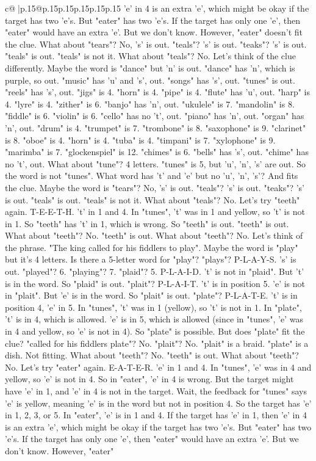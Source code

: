 \documentclass{article}
\begin{document}
{\begin{supertabular}{c@{$\;$}|p{.15\linewidth}@{}p{.15\linewidth}p{.15\linewidth}p{.15\linewidth}p{.15\linewidth}p{.15\linewidth}}
{{{'e' in 4 is an extra 'e', which might be okay if the target has two 'e's. But "eater" has two 'e's. If the target has only one 'e', then "eater" would have an extra 'e'. But we don't know. However, "eater" doesn't fit the clue. What about "tears"? No, 's' is out. "teals"? 's' is out. "teaks"? 's' is out. "teals" is out. "teals" is not it. What about "teals"? No. Let's think of the clue differently. Maybe the word is "dance" but 'n' is out. "dance" has 'n', which is purple, so out. "music" has 'u' and 's', out. "songs" has 's', out. "tunes" is out. "reels" has 's', out. "jigs" is 4. "horn" is 4. "pipe" is 4. "flute" has 'u', out. "harp" is 4. "lyre" is 4. "zither" is 6. "banjo" has 'n', out. "ukulele" is 7. "mandolin" is 8. "fiddle" is 6. "violin" is 6. "cello" has no 't', out. "piano" has 'n', out. "organ" has 'n', out. "drum" is 4. "trumpet" is 7. "trombone" is 8. "saxophone" is 9. "clarinet" is 8. "oboe" is 4. "horn" is 4. "tuba" is 4. "timpani" is 7. "xylophone" is 9. "marimba" is 7. "glockenspiel" is 12. "chimes" is 6. "bells" has 's', out. "chime" has no 't', out. What about "tune"? 4 letters. "tunes" is 5, but 'u', 'n', 's' are out. So the word is not "tunes". What word has 't' and 'e' but no 'u', 'n', 's'? And fits the clue. Maybe the word is "tears"? No, 's' is out. "teals"? 's' is out. "teaks"? 's' is out. "teals" is out. "teals" is not it. What about "teals"? No. Let's try "teeth" again. T{-}E{-}E{-}T{-}H. 't' in 1 and 4. In "tunes", 't' was in 1 and yellow, so 't' is not in 1. So "teeth" has 't' in 1, which is wrong. So "teeth" is out. "teeth" is out. What about "teeth"? No. "teeth" is out. What about "teeth"? No. Let's think of the phrase. "The king called for his fiddlers to play". Maybe the word is "play" but it's 4 letters. Is there a 5{-}letter word for "play"? "plays"? P{-}L{-}A{-}Y{-}S. 's' is out. "played"? 6. "playing"? 7. "plaid"? 5. P{-}L{-}A{-}I{-}D. 't' is not in "plaid". But 't' is in the word. So "plaid" is out. "plait"? P{-}L{-}A{-}I{-}T. 't' is in position 5. 'e' is not in "plait". But 'e' is in the word. So "plait" is out. "plate"? P{-}L{-}A{-}T{-}E. 't' is in position 4, 'e' in 5. In "tunes", 't' was in 1 (yellow), so 't' is not in 1. In "plate", 't' is in 4, which is allowed. 'e' is in 5, which is allowed (since in "tunes", 'e' was in 4 and yellow, so 'e' is not in 4). So "plate" is possible. But does "plate" fit the clue? "called for his fiddlers plate"? No. "plait"? No. "plait" is a braid. "plate" is a dish. Not fitting. What about "teeth"? No. "teeth" is out. What about "teeth"? No. Let's try "eater" again. E{-}A{-}T{-}E{-}R. 'e' in 1 and 4. In "tunes", 'e' was in 4 and yellow, so 'e' is not in 4. So in "eater", 'e' in 4 is wrong. But the target might have 'e' in 1, and 'e' in 4 is not in the target. Wait, the feedback for "tunes" says 'e' is yellow, meaning 'e' is in the word but not in position 4. So the target has 'e' in 1, 2, 3, or 5. In "eater", 'e' is in 1 and 4. If the target has 'e' in 1, then 'e' in 4 is an extra 'e', which might be okay if the target has two 'e's. But "eater" has two 'e's. If the target has only one 'e', then "eater" would have an extra 'e'. But we don't know. However, "eater" }}}
\end{supertabular}}
\end{document}
